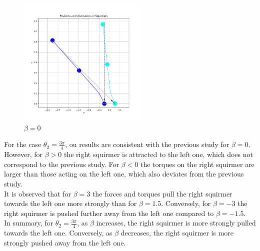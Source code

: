 \documentclass{article}
\begin{document}
\begin{figure}[H]
    \centering
    \includegraphics[width=0.55\textwidth]{graphs/simulations/sim_sq_sq/beta0/3pi_4_.png}
    \caption{\footnotesize $\beta = 0$}
\end{figure}
For the case $\theta_2 = \frac{3\pi}{4}$, ou results are consistent with the previous study\cite{Stark} for 
$\beta = 0$. However, for $\beta > 0$ the right 
squirmer is attracted to the left one,
 which does not correspond to the previous study. For $\beta < 0$ the torques on the right squirmer are larger than
 those acting on the left one, which also deviates from the previous study.\\
It is observed that for $\beta = 3$ the forces and torques pull the right squirmer towards the left one more strongly than for $\beta=1.5$.
Conversely, for $\beta = -3$ the right squirmer is pushed further away from the left one compared to $\beta = -1.5$.\\
In summary, for $\theta_2 = \frac{3\pi}{4}$, as $\beta$ increases, the right squirmer is more strongly pulled towards the left one. Conversely, as
$\beta$ decreases, the right squirmer is more strongly pushed away from the left one.
\end{document}
